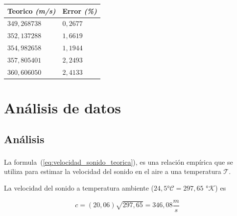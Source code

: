 \documentclass[twocolumn, 12pt]{article}
\newcommand{\bolditalic}[1]{\textbf{\textit{#1}}}
\newcommand{\Celsius}[0]{°$\mathcal{C}$}
\newcommand{\Kelvin}[0]{°$\mathcal{K}$}
\begin{document}
\begin{table}[H]
    \begin{center}
        \begin{tabularx}{.9\linewidth}{|>{\centering\arraybackslash}X|>{\centering\arraybackslash}X|}
            \hline
            Teorico \bolditalic{(m/s)} & Error \bolditalic{(\%)} \\\hline
            $349,268738$               & $0,2677$                \\\hline
            $352,137288$               & $1,6619$                \\\hline
            $354,982658$               & $1,1944$                \\\hline
            $357,805401$               & $2,2493$                \\\hline
            $360,606050$               & $2,4133$                \\\hline
        \end{tabularx}
    \end{center}
\end{table}

\section{Análisis de datos}

\subsection{Análisis}

\subsubsection{}

La formula~(\ref{eq:velocidad_sonido_teorica}), es una
relación empírica que se utiliza para estimar la velocidad
del sonido en el aire a una temperatura $\mathcal{T}$.

La velocidad del sonido a temperatura ambiente
($24,5$\Celsius $= 297,65$ \Kelvin) es

\begin{equation*}
    c = (20,06)\sqrt{297,65} = 346,08 \frac{m}{s}
\end{equation*}

\end{document}
